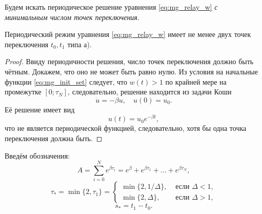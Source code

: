 Будем искать периодическое решение уравнения \eqref{eq:mg_relay_w} \emph{с минимальным числом точек переключения}.

\begin{theorem}
	\label{prop:switching_points_2}
	Периодический режим уравнения \eqref{eq:mg_relay_w} имеет не менее двух точек переключения $t_0, t_1$ типа а).
\end{theorem}
\begin{proof}
	Ввиду периодичности решения, число точек переключения должно быть чётным. Докажем, что оно не может быть равно нулю. Из условия на начальные функции \eqref{eq:mg_init_set} следует, что $w(t) > 1$ по крайней мере на промежутке $[0; \tau_N]$, следовательно, решение находится из задачи Коши
	\begin{equation*}
		\dot{u} = -\beta u, \quad u(0) = u_0.
	\end{equation*}
	Её решение имеет вид
	\begin{equation*}
		u(t) = u_0 e^{-\beta t},
	\end{equation*}
	что не является периодической функцией, следовательно, хотя бы одна точка переключения должна быть.
\end{proof}

Введём обозначения:
%
\begin{equation*}
	A = \sum_{i=0}^{N}e^{\beta \tau_{i}}=e^\beta+e^{\beta \tau_1}+\ldots+e^{\beta \tau_{N}},
\end{equation*}
\begin{equation*}
	\tau_* = \min\{2,\tau_1\}=\left\lbrace\begin{array}{cl}
		\min\{2,1/\Delta\}, & \text{ если } \Delta<1,
		\\
		\min\{2,\Delta\}, & \text{ если } \Delta>1,
	\end{array}\right.
\end{equation*}
\begin{equation*}
	s_* = t_1-t_0.
\end{equation*}

